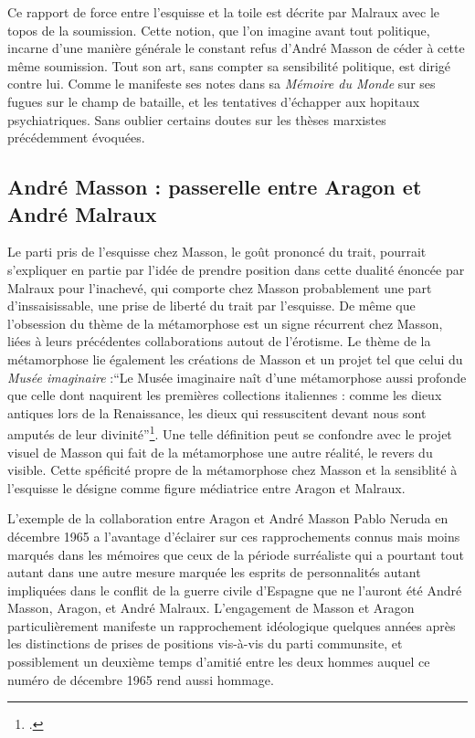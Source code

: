 	Ce rapport de force entre l'esquisse et la toile est décrite par Malraux avec le topos de la soumission. Cette notion, que l'on imagine avant tout politique, incarne d'une manière générale le constant refus d'André Masson de céder à cette même soumission. Tout son art, sans compter sa sensibilité politique, est dirigé contre lui. Comme le manifeste ses notes dans sa \emph{Mémoire du Monde} sur ses fugues sur le champ de bataille, et les tentatives d'échapper aux hopitaux psychiatriques. Sans oublier certains doutes sur les thèses marxistes précédemment évoquées.
	
	\subsection{André Masson : passerelle entre Aragon et André Malraux }
	 Le parti pris de l'esquisse chez Masson, le goût prononcé du trait, pourrait s'expliquer en partie par l'idée de prendre position dans cette dualité énoncée par Malraux pour l'inachevé, qui comporte chez Masson probablement une part d'inssaisissable, une prise de liberté du trait par l'esquisse. De même que l'obsession du thème de la métamorphose est un signe récurrent chez Masson, liées à leurs précédentes collaborations autout de l'érotisme. Le thème de la métamorphose lie également les créations de Masson et un projet tel que celui du \emph{Musée imaginaire} :\enquote{Le Musée imaginaire naît d’une métamorphose aussi profonde que celle dont naquirent les premières collections italiennes : comme les dieux antiques lors de la Renaissance, les dieux qui ressuscitent devant nous sont amputés de leur divinité}\footcite[p179]{museeimaginaire}. Une telle définition peut se confondre avec le projet visuel de Masson qui fait de la métamorphose une autre réalité, le revers du visible.  Cette spéficité propre de la métamorphose  chez Masson et la sensiblité à l'esquisse le désigne comme figure médiatrice entre Aragon et Malraux. 
	

	L'exemple de la collaboration entre Aragon et André Masson Pablo Neruda en décembre 1965 a l'avantage d'éclairer sur ces rapprochements connus mais moins marqués dans les mémoires que ceux de la période surréaliste qui a pourtant tout autant dans une autre mesure marquée les esprits de personnalités autant impliquées dans le conflit de la guerre civile d'Espagne que ne l'auront été André Masson, Aragon, et André Malraux. L'engagement de Masson et Aragon particulièrement manifeste un rapprochement idéologique quelques années après les distinctions de prises de positions vis-à-vis du parti communsite, et possiblement un deuxième temps d'amitié entre les deux hommes auquel ce numéro de décembre 1965 rend aussi hommage. 
	

